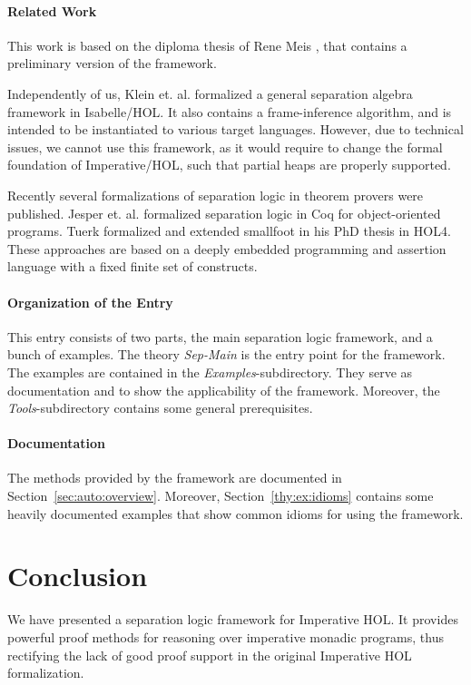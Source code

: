 \documentclass[11pt,a4paper]{article}
\begin{document}
\paragraph{Related Work}
This work is based on the diploma thesis of Rene Meis \cite{Meis2011}, that 
contains a preliminary version of the framework.

Independently of us, Klein et. al. \cite{Klein2012} formalized a general 
separation algebra framework in Isabelle/HOL. It also contains a 
frame-inference algorithm, and is intended to be instantiated to various 
target languages. However, due to technical issues, we cannot use this 
framework, as it would require to change the formal foundation of 
Imperative/HOL, such that partial heaps are properly supported.

Recently several formalizations of separation logic in theorem provers were published. Jesper et. al. \cite{Bengtson2011} formalized separation logic in Coq for object-oriented programs. Tuerk \cite{Tuerk2011} formalized and extended smallfoot \cite{Berdine2005} in his PhD thesis in HOL4. These approaches are based on a deeply embedded programming and assertion language with a fixed finite set of constructs.

\paragraph{Organization of the Entry}
This entry consists of two parts, the main separation logic framework, and a
bunch of examples. The theory {\em Sep-Main} is the entry point for the 
framework. The examples are contained in the {\em Examples}-subdirectory. They 
serve as documentation and to show the applicability of the framework. 
Moreover, the {\em Tools}-subdirectory contains some general prerequisites.

\paragraph{Documentation}
The methods provided by the framework are documented in 
Section~\ref{sec:auto:overview}. Moreover, Section~\ref{thy:ex:idioms} contains
some heavily documented examples that show common idioms for using the 
framework.



\section{Conclusion}
We have presented a separation logic framework for Imperative HOL. It provides
powerful proof methods for reasoning over imperative monadic programs, thus
rectifying the lack of good proof support in the original Imperative HOL 
formalization. 
\end{document}
